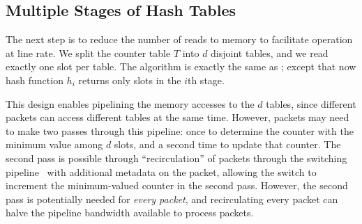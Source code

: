 \subsection{Multiple Stages of Hash Tables}
\label{sec:multiple-stages-d}
The next step is to reduce the number of reads to memory to facilitate operation
at line rate. We split the counter table $T$ into $d$ disjoint tables, and we
read exactly one slot per table. The algorithm is exactly the same as
; except that now hash function $h_i$ returns only slots in the
$i$th stage.

This design enables pipelining the memory accesses to the $d$ tables, since
different packets can access different tables at the same time. However, packets
may need to make two passes through this pipeline: once to determine the counter
with the minimum value among $d$ slots, and a second time to update that
counter. The second pass is possible through ``recirculation'' of packets
through the switching pipeline~\cite{p4-v1.1-spec, ovs-packet-recirculation,
  arista-7050-datasheet} with additional metadata on the packet, allowing the
switch to increment the minimum-valued counter in the second pass. However, the
second pass is potentially needed for {\em every packet}, and recirculating
every packet can halve the pipeline bandwidth available to process packets.


